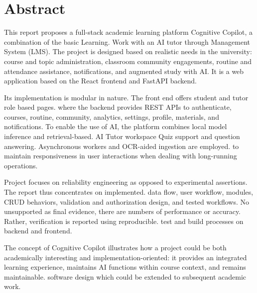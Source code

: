 \chapter*{Abstract}

This report proposes a full-stack academic learning platform Cognitive Copilot, a combination of the basic Learning.
Work with an AI tutor through Management System (LMS). The project is designed based on realistic needs in the university:
course and topic administration, classroom community engagements, routine and attendance assistance, notifications, and
augmented study with AI. It is a web application based on the React frontend and FastAPI backend.

Its implementation is modular in nature. The front end offers student and tutor role based pages.
where the backend provides REST APIs to authenticate, courses, routine, community, analytics, settings, profile,
materials, and notifications. To enable the use of AI, the platform combines local model inference and retrieval-based.
AI Tutor workspace Quiz support and question answering. Asynchronous workers and OCR-aided ingestion are employed.
to maintain responsiveness in user interactions when dealing with long-running operations.

Project focuses on reliability engineering as opposed to experimental assertions. The report thus concentrates on implemented.
data flow, user workflow, modules, CRUD behaviors, validation and authorization design, and tested workflows. No unsupported
as final evidence, there are numbers of performance or accuracy. Rather, verification is reported using reproducible.
test and build processes on backend and frontend.

The concept of Cognitive Copilot illustrates how a project could be both academically interesting and implementation-oriented:
it provides an integrated learning experience, maintains AI functions within course context, and remains maintainable.
software design which could be extended to subsequent academic work.